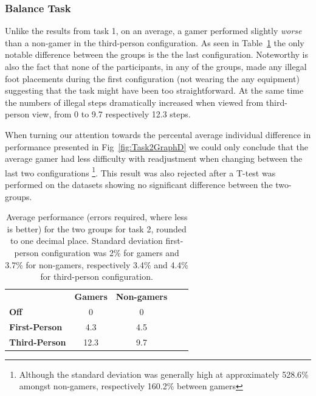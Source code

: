 \documentclass[runningheads,a4paper,oribibl]{llncs}
\begin{document}
\subsubsection{Balance Task}
Unlike the results from task 1, on an average, a gamer performed slightly \emph{worse} than a non-gamer in the third-person configuration. As seen in Table~\ref{tab:Task2GraphP} the only notable difference between the groups is the the last configuration. Noteworthy is also the fact that none of the participants, in any of the groups, made any illegal foot placements during the first configuration (not wearing the any equipment) suggesting that the task might have been too straightforward. At the same time the numbers of illegal steps dramatically increased when viewed from third-person view, from 0 to 9.7 respectively 12.3 steps.  

When turning our attention towards the percental average individual difference in performance presented in Fig~\ref{fig:Task2GraphD} we could only conclude that the average gamer had less difficulty with readjustment when changing between the last two configurations \footnote{Although the standard deviation was generally high at approximately 528.6\% amongst non-gamers, respectively 160.2\% between gamers}. This result was also rejected after a T-test was performed on the datasets showing no significant difference between the two-groups.


\begin{table}[]
\centering
\label{tab:Task2GraphP}
\setlength{\tabcolsep}{1em}
\def\arraystretch{1.8}
\begin{tabular}{l|c|cll}
                      & {\textbf{Gamers}} & {\textbf{Non-gamers}} &  &  \\ \cline{1-3}
\textbf{Off}          & 0                                    & 0                                          &  &  \\ \cline{1-3}
\textbf{First-Person} & 4.3                                   & 4.5                                        &  &  \\ \cline{1-3}
\textbf{Third-Person} & 12.3                                    & 9.7                                        &  & 
\end{tabular}
\caption{Average performance (errors required, where less is better) for the two groups for task 2, rounded to one decimal place. Standard deviation first-person configuration was 2\% for gamers and 3.7\% for non-gamers, respectively 3.4\% and 4.4\% for third-person configuration.}
\end{table}
\end{document}
